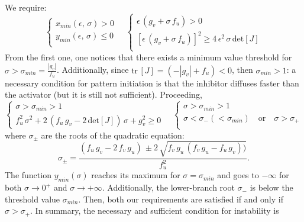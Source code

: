 {\begin{minipage}{0.38\textwidth}
\end{minipage}
\newline
We require:
\begin{equation*}
    \begin{cases}
        x_{min}(\epsilon,\,\sigma)>0 \\
        y_{min}(\epsilon,\,\sigma)\leq 0 \\
    \end{cases}
    \quad
        \begin{cases}
        \epsilon\,(g_v +\sigma\,f_u) > 0 \\
        [\epsilon\,(g_v +\sigma\,f_u)]^2 \geq 4\,\epsilon^2\,\sigma\,\text{det}[J] \\
    \end{cases}
\end{equation*} 
\noindent 
From the first one, one notices that there exists a minimum value threshold for $\sigma > \sigma_{min}= \frac{|g_v|}{f_u}$. Additionally, since $\text{tr}\,[J]=(-|g_v| +f_u)<0$, then $\sigma_{min}> 1$: a necessary condition for pattern initiation is that the inhibitor diffuses faster than the activator  (but it is still not sufficient). Proceeding,
\begin{equation*}
    \begin{cases}
        \sigma > \sigma_{min} >1  \\
        f_u^2\,\sigma^2 + 2\,(f_u\,g_v-2\,\text{det}[J])\,\sigma + g_v^2 \geq 0 
    \end{cases}
    \quad 
    \begin{cases}
    \sigma > \sigma_{min} >1  \\
    \sigma < \sigma_{-}(<\sigma_{min}) \quad \text{or} \quad  \sigma > \sigma_{+}\\
    \end{cases}
\end{equation*} 
where $\sigma_{\pm}$ are the roots of the quadratic equation:
\begin{equation*}
    \sigma_{\pm} = \frac{(f_u\,g_v - 2\,f_v\,g_u)\,\pm 2\,\sqrt{f_v\,g_u\,(f_v\,g_u-f_u\,g_v))}}{f_u^2}.
\end{equation*}
The function $y_{min}(\sigma)$ reaches its maximum for $\sigma=\sigma_{min}$ and goes to $-\infty$ for both $\sigma\rightarrow0^{+}$ and $\sigma\rightarrow +\infty$. Additionally, the lower-branch root $\sigma_{-}$ is below the threshold value $\sigma_{min}$. Then, both our requirements are satisfied if and only if $\sigma>\sigma_{+}$. In summary, the necessary and sufficient condition for instability is
}
